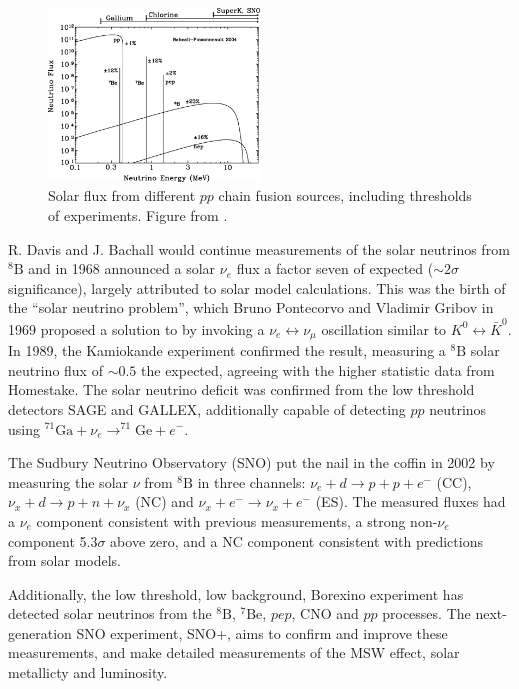 \begin{figure}[h]
	\includegraphics[width=0.5\textwidth, trim={0mm 0mm 0mm 0mm}, clip,page=1]{figures/theory/solar_flux}
	\caption{Solar flux from different $pp$ chain fusion sources, including thresholds of experiments. Figure from \cite{sno_solar_flux}.}
	\label{fig:solar_flux}
\end{figure}

R. Davis and J. Bachall would continue measurements of the solar neutrinos from $^{8}\text{B}$ and in 1968\cite{davis_sun} announced a solar $\nu_e$ flux a factor seven of expected ($\sim2\sigma$ significance), largely attributed to solar model calculations. This was the birth of the ``solar neutrino problem'', which Bruno Pontecorvo and Vladimir Gribov in 1969\cite{pontecorvo_gribov} proposed a solution to by invoking a $\nu_e\leftrightarrow\nu_\mu$ oscillation similar to $K^0 \leftrightarrow\bar{K}^0$. In 1989, the Kamiokande experiment\cite{kamiokande_solar} confirmed the result, measuring a $^{8}\text{B}$ solar neutrino flux of $\sim0.5$ the expected, agreeing with the higher statistic data from Homestake\cite{davis_sun2}. The solar neutrino deficit was confirmed from the low threshold detectors SAGE\cite{sage_solar} and GALLEX\cite{gallex_solar}, additionally capable of detecting $p p$ neutrinos using $^{71}\text{Ga}+\nu_e \rightarrow ^{71}\text{Ge}+e^-$.

The Sudbury Neutrino Observatory (SNO) put the nail in the coffin in 2002\cite{sno_solar} by measuring the solar $\nu$ from $^{8}\text{B}$ in three channels: $\nu_e + d \rightarrow p+p+e^-$ (CC), $\nu_x + d\rightarrow p+ n + \nu_x$ (NC) and $\nu_x + e^- \rightarrow \nu_x+e^-$ (ES). The measured fluxes had a $\nu_e$ component consistent with previous measurements, a strong non-$\nu_e$ component 5.3$\sigma$ above zero, and a NC component consistent with predictions from solar models.

Additionally, the low threshold, low background, Borexino experiment has detected solar neutrinos from the $^{8}\text{B}$, $^{7}\text{Be}$, $pep$, CNO and $pp$ processes\cite{borexino_summary}. The next-generation SNO experiment, SNO+, aims to confirm and improve these measurements, and make detailed measurements of the MSW effect, solar metallicty and luminosity.

